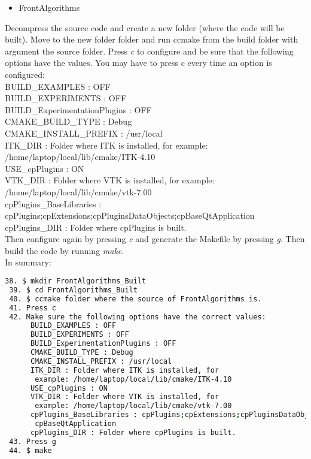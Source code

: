 \documentclass[12pt]{article}
\begin{document}
\begin{par}
\begin{lstlisting}[language=bash]
\end{lstlisting}

\end{par}
\normalsize

\begin{itemize}
\item FrontAlgorithms
\end{itemize}
\begin{par}

Decompress the source code and create a new folder (where
the code will be built). Move to the new folder folder and run ccmake from the build folder with argument the
source folder. Press \textit{c} to configure and be sure that the following options have the values. You may have to press c every time an option is configured:\\

\noindent
 BUILD\_EXAMPLES : OFF\\
 BUILD\_EXPERIMENTS : OFF\\
 BUILD\_ExperimentationPlugins : OFF\\
 CMAKE\_BUILD\_TYPE : Debug\\
 CMAKE\_INSTALL\_PREFIX : /usr/local\\
 ITK\_DIR : Folder where ITK is installed, for example: /home/laptop/local/lib/cmake/ITK-4.10\\
 USE\_cpPlugins : ON\\
 VTK\_DIR : Folder where VTK is installed, for example: /home/laptop/local/lib/cmake/vtk-7.00\\
 cpPlugins\_BaseLibraries : cpPlugins;cpExtensions;cpPluginsDataObjects;cpBaseQtApplication\\
 cpPlugins\_DIR : Folder where cpPlugins is built.\\

Then configure again by pressing \textit{c} and generate the Makefile by pressing \textit{g}.
Then build the code by running \textit{make}.\\

In summary:\\

\noindent
\small
\begin{lstlisting}[language=bash]
 38. $ mkdir FrontAlgorithms_Built
 39. $ cd FrontAlgorithms_Built
 40. $ ccmake folder where the source of FrontAlgorithms is.
 41. Press c 
 42. Make sure the following options have the correct values:
      BUILD_EXAMPLES : OFF
      BUILD_EXPERIMENTS : OFF
      BUILD_ExperimentationPlugins : OFF
      CMAKE_BUILD_TYPE : Debug
      CMAKE_INSTALL_PREFIX : /usr/local
      ITK_DIR : Folder where ITK is installed, for 
       example: /home/laptop/local/lib/cmake/ITK-4.10
      USE_cpPlugins : ON
      VTK_DIR : Folder where VTK is installed, for 
       example: /home/laptop/local/lib/cmake/vtk-7.00
      cpPlugins_BaseLibraries : cpPlugins;cpExtensions;cpPluginsDataObjects;
       cpBaseQtApplication
      cpPlugins_DIR : Folder where cpPlugins is built.
 43. Press g
 44. $ make
 
\end{lstlisting}


\end{par}
\normalsize
\end{document}
